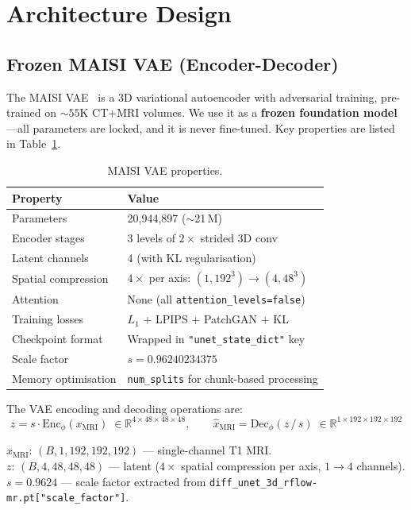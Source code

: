\documentclass[11pt,a4paper]{article}
\newcommand{\code}[1]{\texttt{#1}}
\begin{document}
\section{Architecture Design}
\label{sec:architecture}

\subsection{Frozen MAISI VAE (Encoder-Decoder)}

The MAISI VAE~\cite{maisi} is a 3D variational autoencoder with adversarial
training, pre-trained on ${\sim}55$K CT+MRI volumes.  We use it as a
\textbf{frozen foundation model}---all parameters are locked, and it is never
fine-tuned. Key properties are listed in Table~\ref{tab:vae}.

\begin{table}[ht]
\centering
\caption{MAISI VAE properties.}
\label{tab:vae}
\begin{tabular}{ll}
\toprule
\textbf{Property}      & \textbf{Value} \\
\midrule
Parameters             & 20,944,897 (${\sim}$21\,M) \\
Encoder stages         & 3 levels of $2\times$ strided 3D conv \\
Latent channels        & 4 (with KL regularisation) \\
Spatial compression    & $4\times$ per axis: $(1,192^3)\!\to\!(4,48^3)$ \\
Attention              & None (all \code{attention\_levels=false}) \\
Training losses        & $L_1$ + LPIPS + PatchGAN + KL \\
Checkpoint format      & Wrapped in \code{"unet\_state\_dict"} key \\
Scale factor           & $s = 0.96240234375$ \\
Memory optimisation    & \code{num\_splits} for chunk-based processing \\
\bottomrule
\end{tabular}
\end{table}

The VAE encoding and decoding operations are:
\begin{equation}
  z = s \cdot \mathrm{Enc}_\phi(x_\mathrm{MRI})
    \;\in \mathbb{R}^{4 \times 48 \times 48 \times 48},
  \qquad
  \hat{x}_\mathrm{MRI} = \mathrm{Dec}_\phi(z\,/\,s)
    \;\in \mathbb{R}^{1 \times 192 \times 192 \times 192}
  \label{eq:vae}
\end{equation}
\begin{shapes}
$x_\mathrm{MRI}$: $(B, 1, 192, 192, 192)$ --- single-channel T1 MRI.\\
$z$: $(B, 4, 48, 48, 48)$ --- latent ($4\times$ spatial compression per axis, $1 \to 4$ channels).\\
$s = 0.9624$ --- scale factor extracted from
\code{diff\_unet\_3d\_rflow-mr.pt["scale\_factor"]}.
\end{shapes}
\end{document}
